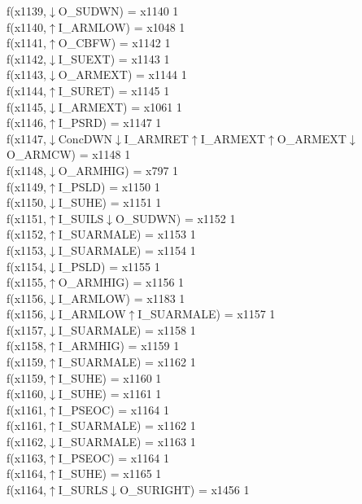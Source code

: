 f(x1139,$\downarrow$O\_SUDWN) = x1140 {1} \\
f(x1140,$\uparrow$I\_ARMLOW) = x1048 {1} \\
f(x1141,$\uparrow$O\_CBFW) = x1142 {1} \\
f(x1142,$\downarrow$I\_SUEXT) = x1143 {1} \\
f(x1143,$\downarrow$O\_ARMEXT) = x1144 {1} \\
f(x1144,$\uparrow$I\_SURET) = x1145 {1} \\
f(x1145,$\downarrow$I\_ARMEXT) = x1061 {1} \\
f(x1146,$\uparrow$I\_PSRD) = x1147 {1} \\
f(x1147,$\downarrow$ConcDWN$\downarrow$I\_ARMRET$\uparrow$I\_ARMEXT$\uparrow$O\_ARMEXT$\downarrow$O\_ARMCW) = x1148 {1} \\
f(x1148,$\downarrow$O\_ARMHIG) = x797 {1} \\
f(x1149,$\uparrow$I\_PSLD) = x1150 {1} \\
f(x1150,$\downarrow$I\_SUHE) = x1151 {1} \\
f(x1151,$\uparrow$I\_SUILS$\downarrow$O\_SUDWN) = x1152 {1} \\
f(x1152,$\uparrow$I\_SUARMALE) = x1153 {1} \\
f(x1153,$\downarrow$I\_SUARMALE) = x1154 {1} \\
f(x1154,$\downarrow$I\_PSLD) = x1155 {1} \\
f(x1155,$\uparrow$O\_ARMHIG) = x1156 {1} \\
f(x1156,$\downarrow$I\_ARMLOW) = x1183 {1} \\
f(x1156,$\downarrow$I\_ARMLOW$\uparrow$I\_SUARMALE) = x1157 {1} \\
f(x1157,$\downarrow$I\_SUARMALE) = x1158 {1} \\
f(x1158,$\uparrow$I\_ARMHIG) = x1159 {1} \\
f(x1159,$\uparrow$I\_SUARMALE) = x1162 {1} \\
f(x1159,$\uparrow$I\_SUHE) = x1160 {1} \\
f(x1160,$\downarrow$I\_SUHE) = x1161 {1} \\
f(x1161,$\uparrow$I\_PSEOC) = x1164 {1} \\
f(x1161,$\uparrow$I\_SUARMALE) = x1162 {1} \\
f(x1162,$\downarrow$I\_SUARMALE) = x1163 {1} \\
f(x1163,$\uparrow$I\_PSEOC) = x1164 {1} \\
f(x1164,$\uparrow$I\_SUHE) = x1165 {1} \\
f(x1164,$\uparrow$I\_SURLS$\downarrow$O\_SURIGHT) = x1456 {1} \\
